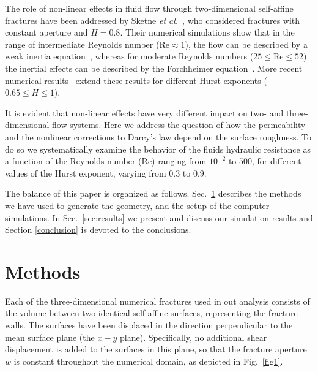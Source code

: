 \documentclass[aps,pre,
superscriptaddress,
twocolumn,
notitlepage,
10pt,]{revtex4-1}
\begin{document}
The role of non-linear effects in fluid flow through two-dimensional self-affine
fractures have been addressed by Sketne \emph{et al.}~\cite{Skjetne1999}, who
considered fractures with constant aperture and $H=0.8$.
%
Their numerical simulations show that in the range of intermediate
Reynolds number ($\mathrm{Re} \approx 1$), the flow can be described
by a weak inertia equation~\cite{Mei1991, WODIE1991},  whereas for moderate
Reynolds numbers ($25 \leq \mathrm{Re} \leq 52$) the inertial effects can
be described by the Forchheimer equation~\cite{Forchheimer1901}. More
recent numerical results~\cite{Briggs2017} extend these results for
different Hurst exponents ($0.65 \leq H \leq 1$).


It is evident that non-linear effects have very different impact on two-
and three-dimensional flow systems. Here we address the question of how the
permeability and the nonlinear corrections to Darcy's law depend on the
surface roughness. To do so we systematically examine the behavior of the
fluids hydraulic resistance as a function of the Reynolds number
($\mathrm{Re}$) ranging from $10^{-2}$ to $500$, for different values of
the Hurst exponent, varying from $0.3$ to $0.9$.

The balance of this paper is organized as follows. Sec.~\ref{sec:methods}
describes the methods we have used to generate the geometry, and the setup
of the computer simulations. In Sec.~\ref{sec:results} we present and
discuss our simulation results and Section \ref{conclusion} is devoted to
the conclusions.

\section{Methods}\label{sec:methods}

Each of the three-dimensional numerical fractures used in out analysis consists
of the volume between  two identical self-affine surfaces, representing the
fracture walls. The surfaces have been displaced in the direction perpendicular
to the mean surface plane (the $x-y$ plane). Specifically, no additional shear
displacement is added to the surfaces in this plane, so that the fracture
aperture $w$ is constant throughout the numerical domain, as depicted in
Fig.~\ref{fig1}.
\end{document}
